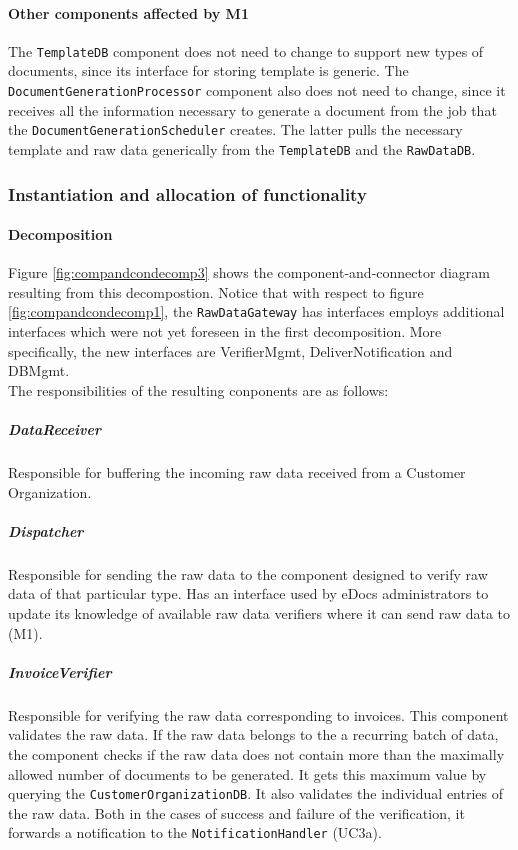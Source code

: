 \documentclass[a4paper,10pt]{article}
\begin{document}
\paragraph{Other components affected by M1}
The \texttt{TemplateDB} component does not need to change to support new types of documents, since its interface for storing template is generic. The \texttt{DocumentGenerationProcessor} component also does not need to change, since it receives all the information necessary to generate a document from the job that the \texttt{DocumentGenerationScheduler} creates. The latter pulls the necessary template and raw data generically from the \texttt{TemplateDB} and the \texttt{RawDataDB}.
\subsubsection{Instantiation and allocation of functionality}
\paragraph{Decomposition}
Figure \ref{fig:compandcondecomp3} shows the component-and-connector diagram resulting from this decompostion. Notice that with respect to figure  \ref{fig:compandcondecomp1}, the \texttt{RawDataGateway} has interfaces employs additional interfaces which were not yet foreseen in the first decomposition. More specifically, the new interfaces are VerifierMgmt, DeliverNotification and DBMgmt.\\
The responsibilities of the resulting conponents are as follows:
\subparagraph{DataReceiver} Responsible for buffering the incoming raw data received from a Customer Organization.

\subparagraph{Dispatcher} Responsible for sending the raw data to the component designed to verify raw data of that particular type. Has an interface used by eDocs administrators to update its knowledge of available raw data verifiers where it can send raw data to (M1).

\subparagraph{InvoiceVerifier} Responsible for verifying the raw data corresponding to invoices. This component validates the raw data. If the raw data belongs to the a recurring batch of data, the component checks if the raw data does not contain more than the maximally allowed number of documents to be generated. It gets this maximum value by querying the \texttt{CustomerOrganizationDB}. It also validates the individual entries of the raw data. Both in the cases of success and failure of the verification, it forwards a notification to the \texttt{NotificationHandler} (UC3a).
\end{document}
